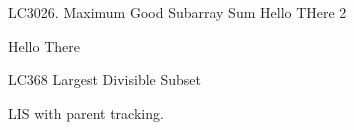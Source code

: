 \begin{problem}{LC3026. Maximum Good Subarray Sum}
    Hello THere 2
\end{problem}

\begin{solution}

    \begin{code3}
        Hello There
    \end{code3}
\end{solution}

\begin{problem}{LC368 Largest Divisible Subset}
\end{problem}

\begin{solution}[Pure LIS (=ending at idx)]

    LIS with parent tracking.
\end{solution}
